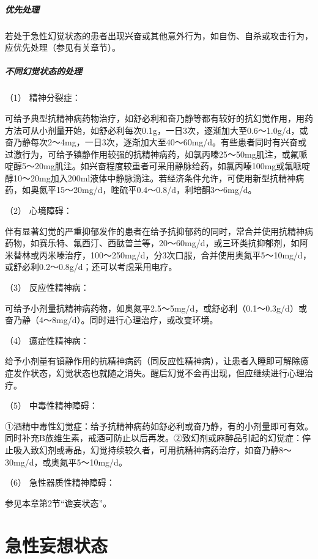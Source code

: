 \subparagraph{优先处理}

若处于急性幻觉状态的患者出现兴奋或其他意外行为，如自伤、自杀或攻击行为，应优先处理（参见有关章节）。

\subparagraph{不同幻觉状态的处理}

\hypertarget{text00048.htmlux5cux23CHP1-18-6-3-2-1}{}
（1） 精神分裂症：

可给予典型抗精神病药物治疗，如舒必利和奋乃静等都有较好的抗幻觉作用，用药方法可从小剂量开始，如舒必利每次0.1g，一日3次，逐渐加大至0.6～1.0g/d，或奋乃静每次2～4mg，一日3次，逐渐加大至40～60mg/d。有些患者同时有兴奋或过激行为，可给予镇静作用较强的抗精神病药，如氯丙嗪25～50mg肌注，或氟哌啶醇5～20mg肌注。如兴奋程度较重者可采用静脉给药，如氯丙嗪100mg或氟哌啶醇10～20mg加入200ml液体中静脉滴注。若经济条件允许，可使用新型抗精神病药，如奥氮平15～20mg/d，喹硫平0.4～0.8/d，利培酮3～6mg/d。

\hypertarget{text00048.htmlux5cux23CHP1-18-6-3-2-2}{}
（2） 心境障碍：

伴有显著幻觉的严重抑郁发作的患者在给予抗抑郁药的同时，常合并使用抗精神病药物，如赛乐特、氟西汀、西酞普兰等，20～60mg/d，或三环类抗抑郁剂，如阿米替林或丙米嗪治疗，100～250mg/d，分3次口服，合并使用奥氮平5～10mg/d，或舒必利0.2～0.8g/d；还可以考虑采用电疗。

\hypertarget{text00048.htmlux5cux23CHP1-18-6-3-2-3}{}
（3） 反应性精神病：

可给予小剂量抗精神病药物，如奥氮平2.5～5mg/d，或舒必利（0.1～0.3g/d）或奋乃静（4～8mg/d）。同时进行心理治疗，或改变环境。

\hypertarget{text00048.htmlux5cux23CHP1-18-6-3-2-4}{}
（4） 癔症性精神病：

给予小剂量有镇静作用的抗精神病药（同反应性精神病），让患者入睡即可解除癔症发作状态，幻觉状态也就随之消失。醒后幻觉不会再出现，但应继续进行心理治疗。

\hypertarget{text00048.htmlux5cux23CHP1-18-6-3-2-5}{}
（5） 中毒性精神障碍：

①酒精中毒性幻觉症：给予抗精神病药如舒必利或奋乃静，有的小剂量即可有效。同时补充B族维生素，戒酒可防止以后再发。②致幻剂或麻醉品引起的幻觉症：停止吸入致幻剂或毒品，幻觉持续较久者，可用抗精神病药治疗，如奋乃静8～30mg/d，或奥氮平5～10mg/d。

\hypertarget{text00048.htmlux5cux23CHP1-18-6-3-2-6}{}
（6） 急性器质性精神障碍：

参见本章第2节“谵妄状态”。

\protect\hypertarget{text00049.html}{}{}

\section{急性妄想状态}

